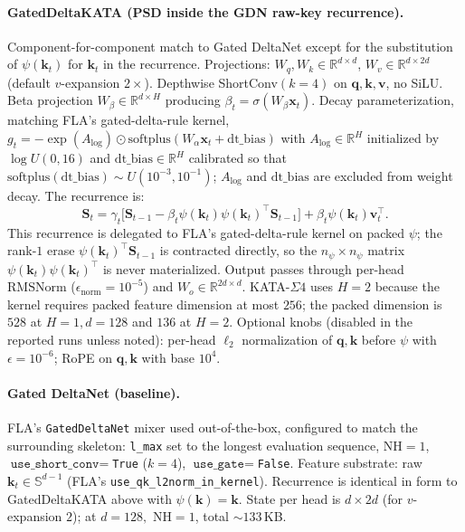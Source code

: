 \documentclass{article}
\newcommand{\1}{\bm{1}}
\def\eps{{\epsilon}}
\def\vk{{\bm{k}}}
\def\vq{{\bm{q}}}
\def\vv{{\bm{v}}}
\def\vx{{\bm{x}}}
\def\mS{{\bm{S}}}
\newcommand{\R}{\mathbb{R}}
\theoremstyle{definition}
\begin{document}
\paragraph{GatedDeltaKATA (PSD inside the GDN raw-key recurrence).} Component-for-component match to Gated DeltaNet except for the substitution of $\psi(\vk_t)$ for
$\vk_t$ in the recurrence. Projections: $W_q,W_k\in\R^{d\times d}$, $W_v\in\R^{d\times 2d}$
(default $v$-expansion $2\times$). Depthwise ShortConv$(k{=}4)$ on $\vq,\vk,\vv$, no SiLU. Beta
projection $W_\beta\in\R^{d\times H}$ producing $\beta_t=\sigma(W_\beta\vx_t)$. Decay
parameterization, matching FLA's gated-delta-rule kernel, $g_t =
  -\exp(A_{\text{log}})\odot\mathrm{softplus}(W_\alpha\vx_t + \mathrm{dt\_bias})$ with
$A_{\text{log}}\in\R^H$ initialized by $\log U(0,16)$ and $\mathrm{dt\_bias}\in\R^H$ calibrated so
that $\mathrm{softplus}(\mathrm{dt\_bias})\sim U(10^{-3},10^{-1})$; $A_{\text{log}}$ and
$\mathrm{dt\_bias}$ are excluded from weight decay. The recurrence is:
\[
  \mS_t
  =\gamma_t\bigl[\mS_{t-1}-\beta_t\psi(\vk_t)\psi(\vk_t)^\top\mS_{t-1}\bigr]
   +\beta_t\psi(\vk_t)\vv_t^\top.
\]
This recurrence is delegated to FLA's gated-delta-rule kernel on packed $\psi$; the rank-$1$ erase
$\psi(\vk_t)^\top\mS_{t-1}$ is contracted directly, so the
$n_\psi\times n_\psi$ matrix $\psi(\vk_t)\psi(\vk_t)^\top$ is never materialized. Output passes
through per-head $\mathrm{RMSNorm}$ ($\eps_\text{norm}=10^{-5}$) and $W_o\in\R^{2d\times d}$.
KATA-$\Sigma4$ uses $H=2$ because the kernel requires packed feature dimension at most $256$; the
packed dimension is $528$ at $H=1,d=128$ and $136$ at $H=2$. Optional knobs (disabled
in the reported runs unless noted): per-head $\ell_2$ normalization of $\vq,\vk$ before $\psi$ with $\eps=10^{-6}$; RoPE on $\vq,\vk$ with base $10^4$.

\paragraph{Gated DeltaNet (baseline).} FLA's \texttt{GatedDeltaNet} mixer used out-of-the-box, configured to match the surrounding
skeleton: \texttt{l\_max} set to the longest evaluation sequence, NH$=1$,
$\texttt{use\_short\_conv}=$\texttt{True} ($k{=}4$), $\texttt{use\_gate}=$\texttt{False}. Feature
substrate: raw $\vk_t\in\mathbb{S}^{d-1}$ (FLA's \texttt{use\_qk\_l2norm\_in\_kernel}). Recurrence
is identical in form to GatedDeltaKATA above with $\psi(\vk)=\vk$. State per head is $d\times 2d$
(for $v$-expansion $2$); at $d{=}128,$ NH$=1$, total $\sim\!133$\,KB.
\end{document}
